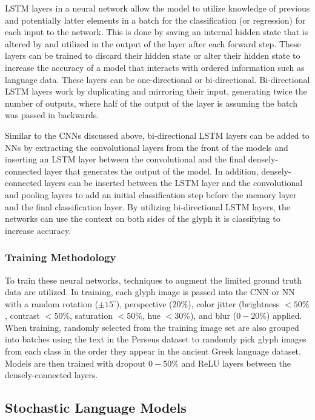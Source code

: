 LSTM layers in a neural network allow the model to utilize knowledge of previous and potentially latter elements in a batch for the classification (or regression) for each input to the network. This is done by saving an internal hidden state that is altered by and utilized in the output of the layer after each forward step. These layers can be trained to discard their hidden state or alter their hidden state to increase the accuracy of a model that interacts with ordered information such as language data. These layers can be one-directional or bi-directional. Bi-directional LSTM layers work by duplicating and mirroring their input, generating twice the number of outputs, where half of the output of the layer is assuming the batch was passed in backwards.

Similar to the CNNs discussed above, bi-directional LSTM layers can be added to NNs by extracting the convolutional layers from the front of the models and inserting an LSTM layer between the convolutional and the final densely-connected layer that generates the output of the model. In addition, densely-connected layers can be inserted between the LSTM layer and the convolutional and pooling layers to add an initial classification step before the memory layer and the final classification layer. By utilizing bi-directional LSTM layers, the networks can use the context on both sides of the glyph it is classifying to increase accuracy.

\subsubsection{Training Methodology}

To train these neural networks, techniques to augment the limited ground truth data are utilized. In training, each glyph image is passed into the CNN or NN with a random rotation ($\pm 15^\circ$), perspective ($20\%$), color jitter (brightness $<50\%$, contrast $<50\%$, saturation $<50\%$, hue $<30\%$), and blur ($0-20\%$) applied. When training, randomly selected from the training image set are also grouped into batches using the text in the Perseus dataset to randomly pick glyph images from each class in the order they appear in the ancient Greek language dataset. Models are then trained with dropout $0-50\%$ and ReLU layers between the densely-connected layers.

\subsection{Stochastic Language Models}


